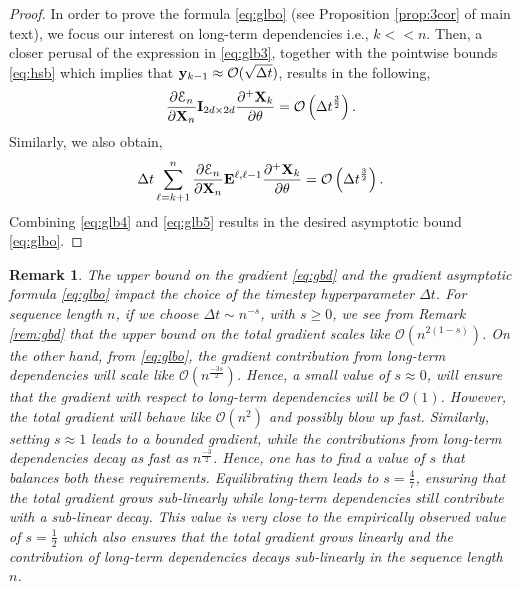 \documentclass{article} \usepackage{iclr2022_conference,times}
\newcommand{\by}{{\bf y}}
\newcommand{\bX}{{\bf X}}
\newcommand{\ord}{{\mathcal O}}
\newcommand{\Dt}{{\Delta t}}
\newcommand{\E}{\EuScript{E}}
\newcommand{\bE}{{\bf E}}
\newtheorem{remark}[theorem]{Remark}
\begin{document}
\begin{proof}
In order to prove the formula \eqref{eq:glbo} (see Proposition \ref{prop:3cor} of main text), we focus our interest on long-term dependencies i.e., $k << n $. Then, a closer perusal of the expression in \eqref{eq:glb3}, together with the pointwise bounds \eqref{eq:hsb} which implies that $\by_{k-1} \approx \ord(\sqrt{\Dt})$, results in the following,
\begin{equation}
\label{eq:glb4}
\frac{\partial \E_n}{\partial \bX_n} {\bf I}_{2d \times 2d}\frac{\partial^{+} \bX_k}{\partial \theta} = \ord\left(\Dt^\frac{3}{2}\right).
\end{equation}
Similarly, we also obtain,
\begin{equation}
\label{eq:glb5}
\Dt\sum\limits_{\ell=k+1}^n \frac{\partial \E_n}{\partial \bX_n} \bE^{\ell,\ell-1} \frac{\partial^{+} \bX_k}{\partial \theta} = \ord\left(\Dt^\frac{3}{2}\right).
\end{equation}
Combining \eqref{eq:glb4} and \eqref{eq:glb5} results in the desired asymptotic bound \eqref{eq:glbo}.
\end{proof}
\begin{remark}
\label{rem:dtval}
The upper bound on the gradient \eqref{eq:gbd} and the gradient asymptotic formula \eqref{eq:glbo} impact the choice of the timestep hyperparameter $\Dt$. For sequence length $n$, if we choose $\Dt \sim n^{-s}$, with $s \geq 0$, we see from Remark \ref{rem:gbd} that the upper bound on the total gradient scales like $\ord(n^{2(1-s)})$. On the other hand, from \eqref{eq:glbo}, the gradient contribution from long-term dependencies will scale like $\ord(n^{\frac{-3s}{2}})$. Hence, a small value of $s \approx 0$, will ensure that the gradient with respect to long-term dependencies will be $\ord(1)$. However, the total gradient will behave like $\ord(n^2)$ and possibly blow up fast. Similarly, setting $s\approx 1$ leads to a bounded gradient, while the contributions from long-term dependencies decay as fast as $n^{\frac{-3}{2}}$. Hence, one has to find a value of $s$ that balances both these requirements. Equilibrating them leads to $s = \frac{4}{7}$, ensuring that the total gradient grows sub-linearly while long-term dependencies still contribute with a sub-linear decay. This value is very close to the empirically observed value of $s = \frac{1}{2}$ which also ensures that the total gradient grows linearly and the contribution of long-term dependencies decays sub-linearly in the sequence length $n$.
\end{remark}
\end{document}
